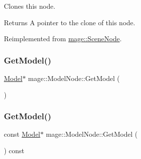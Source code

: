 Clones this node.

\begin{DoxyReturn}{Returns}
A pointer to the clone of this node. 
\end{DoxyReturn}


Reimplemented from \hyperlink{classmage_1_1_scene_node_a42d0d53ab804d38ebd584d2de6490eeb}{mage\+::\+Scene\+Node}.

\hypertarget{classmage_1_1_model_node_a8964223fd592fd23949d6f996c40a482}{}\label{classmage_1_1_model_node_a8964223fd592fd23949d6f996c40a482} 
\subsubsection{\texorpdfstring{Get\+Model()}{GetModel()}\hspace{0.1cm}{\footnotesize\ttfamily [1/2]}}
{\footnotesize\ttfamily \hyperlink{classmage_1_1_model}{Model}$\ast$ mage\+::\+Model\+Node\+::\+Get\+Model (\begin{DoxyParamCaption}{ }\end{DoxyParamCaption})\hspace{0.3cm}{\ttfamily [noexcept]}}

\hypertarget{classmage_1_1_model_node_ad8c4978c4d14ed015fdb517ba86ebd93}{}\label{classmage_1_1_model_node_ad8c4978c4d14ed015fdb517ba86ebd93} 
\subsubsection{\texorpdfstring{Get\+Model()}{GetModel()}\hspace{0.1cm}{\footnotesize\ttfamily [2/2]}}
{\footnotesize\ttfamily const \hyperlink{classmage_1_1_model}{Model}$\ast$ mage\+::\+Model\+Node\+::\+Get\+Model (\begin{DoxyParamCaption}{ }\end{DoxyParamCaption}) const\hspace{0.3cm}{\ttfamily [noexcept]}}

\hypertarget{classmage_1_1_model_node_ad8378279b79930dfe98d176dbc1c5db9}{}\label{classmage_1_1_model_node_ad8378279b79930dfe98d176dbc1c5db9} 
